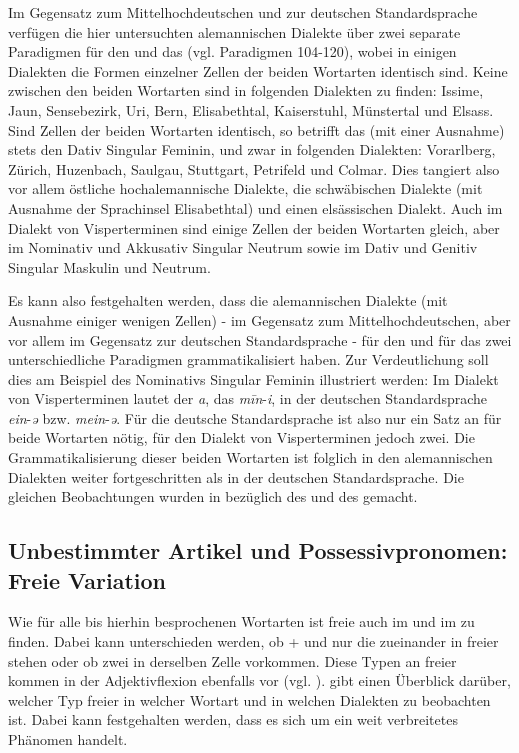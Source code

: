 Im Gegensatz zum Mittelhochdeutschen und zur deutschen Standardsprache verfügen die hier untersuchten alemannischen Dialekte über zwei separate Paradigmen für den  und das  (vgl. Paradigmen 104-120), wobei in einigen Dialekten die Formen einzelner Zellen der beiden Wortarten identisch sind. Keine  zwischen den beiden Wortarten sind in folgenden Dialekten zu finden: Issime, Jaun, Sensebezirk, Uri, Bern, Elisabethtal, Kaiserstuhl, Münstertal und Elsass. Sind Zellen der beiden Wortarten identisch, so betrifft das (mit einer Ausnahme) stets den Dativ Singular Feminin, und zwar in folgenden Dialekten: Vorarlberg, Zürich, Huzenbach, Saulgau, Stuttgart, Petrifeld und Colmar. Dies tangiert also vor allem östliche hochalemannische Dialekte, die schwäbischen Dialekte (mit Ausnahme der Sprachinsel Elisabethtal) und einen elsässischen Dialekt. Auch im Dialekt von Visperterminen sind einige Zellen der beiden Wortarten gleich, aber im Nominativ und Akkusativ Singular Neutrum sowie im Dativ und Genitiv Singular Maskulin und Neutrum.

Es kann also festgehalten werden, dass die alemannischen Dialekte (mit Ausnahme einiger wenigen Zellen) - im Gegensatz zum Mittelhochdeutschen, aber vor allem im Gegensatz zur deutschen Standardsprache - für den  und für das  zwei unterschiedliche Paradigmen grammatikalisiert haben. Zur Verdeutlichung soll dies am Beispiel des Nominativs Singular Feminin illustriert werden: Im Dialekt von Visperterminen lautet der  \textit{a}, das  \textit{m\=in}-\textit{i}, in der deutschen Standardsprache \textit{ein}-\textit{ə} bzw. \textit{mein}-\textit{ə}. Für die deutsche Standardsprache ist also nur ein Satz an  für beide Wortarten nötig, für den Dialekt von Visperterminen jedoch zwei. Die Grammatikalisierung dieser beiden Wortarten ist folglich in den alemannischen Dialekten weiter fortgeschritten als in der deutschen Standardsprache. Die gleichen Beobachtungen wurden in  bezüglich des  und des  gemacht.

\subsection{Unbestimmter Artikel und Possessivpronomen: Freie Variation}\label{5.6.3}

Wie für alle bis hierhin besprochenen Wortarten ist freie  auch im  und im  zu finden. Dabei kann unterschieden werden, ob  +  und nur die  zueinander in freier  stehen oder ob zwei  in derselben Zelle vorkommen. Diese Typen an freier  kommen in der Adjektivflexion ebenfalls vor (vgl. ).  gibt einen Überblick darüber, welcher Typ freier  in welcher Wortart und in welchen Dialekten zu beobachten ist. Dabei kann festgehalten werden, dass es sich um ein weit verbreitetes Phänomen handelt.

